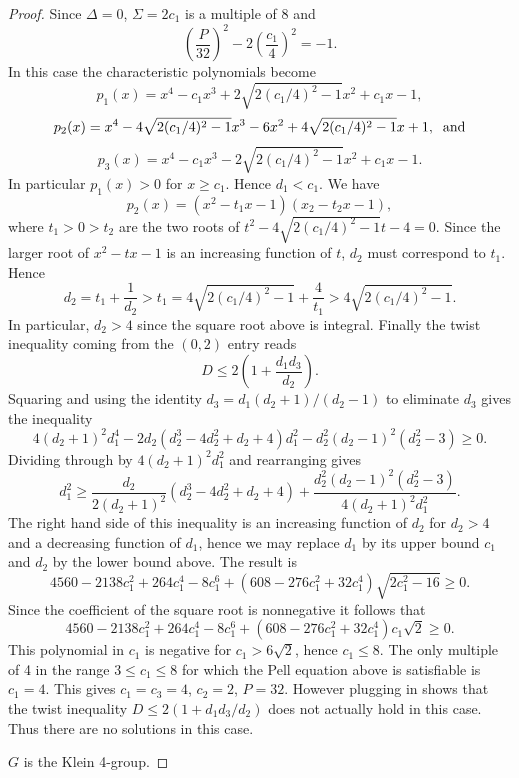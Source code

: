 \documentclass[12pt,psamsfonts]{amsart}
\numberwithin{equation}{section}
\theoremstyle{definition}
\begin{document}
\begin{proof}
Since $\Delta=0$, $\Sigma=2c_1$ is a multiple of 8 and
$$\left(\frac{P}{32}\right)^2-2\left(\frac{c_1}{4}\right)^2 = -1.$$
In this case the characteristic polynomials become
$$p_1(x)=x^4 - c_1 x^3 + 2 {\sqrt {2(c_1/4)^2-1}} x^2 + c_1 x -1,$$
$$p_2(x)=x^4 - 4 {\sqrt {2(c_1/4)^2-1}} x^3 -6 x^2 +4 {\sqrt {2(c_1/4)^2-1}} x
+ 1,\;\; {\rm and}$$
$$p_3(x)=x^4 - c_1 x^3 - 2 {\sqrt {2(c_1/4)^2-1}} x^2 + c_1 x -1.$$
In particular $p_1(x)>0$ for $x\ge c_1$. Hence $d_1<c_1$.
We have
$$p_2(x) = (x^2 - t_1 x -1)(x_2 - t_2 x - 1),$$
where $t_1>0>t_2$ are the two roots of $t^2 - 4 {\sqrt
{2(c_1/4)^2-1}} t - 4 =0$. Since the larger root of $x^2-tx-1$ is
an increasing function of $t$, $d_2$ must correspond to $t_1$.
Hence
$$d_2 = t_1 + \frac{1}{d_2} > t_1 = 4 {\sqrt {2(c_1/4)^2-1}} + \frac{4}{t_1}
> 4 {\sqrt {2(c_1/4)^2-1}}.$$
In particular, $d_2>4$ since the square root above is integral.
Finally the twist inequality coming from the $(0,2)$ entry reads
$$D\le 2 \left( 1+ \frac{d_1d_3}{d_2}\right).$$
Squaring and using the identity $d_3=d_1 (d_2+1)/(d_2-1)$ to
eliminate $d_3$ gives the inequality
$$4(d_2+1)^2 d_1^4 -2 d_2 (d_2^3-4d_2^2 + d_2 + 4) d_1^2
- d_2^2 (d_2-1)^2 (d_2^2-3)\ge 0.$$ Dividing through by
$4(d_2+1)^2 d_1^2$ and rearranging gives
$$d_1^2 \ge \frac{d_2}{2(d_2+1)^2}(d_2^3-4d_2^2 + d_2 + 4) +
\frac{d_2^2(d_2-1)^2(d_2^2-3)}{4(d_2+1)^2d_1^2}.$$ The right hand
side of this inequality is an increasing function of $d_2$ for
$d_2>4$ and a decreasing function of $d_1$, hence we may replace
$d_1$ by its upper bound $c_1$ and $d_2$ by the lower bound above.
The result is
$$4560 - 2138 c_1^2 + 264 c_1^4 - 8 c_1^6 +
(608 - 276 c_1^2 + 32 c_1^4) {\sqrt {2 c_1^2-16}}\ge 0.$$ Since
the coefficient of the square root is nonnegative it follows that
$$4560 - 2138 c_1^2 + 264 c_1^4 - 8 c_1^6 +
(608 - 276 c_1^2 + 32 c_1^4) c_1 {\sqrt {2}}\ge 0.$$ This
polynomial in $c_1$ is negative for $c_1>6 {\sqrt 2}$, hence
$c_1\le 8$. The only multiple of 4 in the range $3\le c_1\le 8$
for which the Pell equation above is satisfiable is $c_1=4$. This
gives $c_1=c_3=4$, $c_2=2$, $P=32$. However plugging in shows that
the twist inequality $D\le 2(1+ d_1 d_3/d_2)$ does not actually
hold in this case. Thus there are no solutions in this case.

\vspace{.5cm}

 $G$ is the Klein 4-group.

\vspace{.5cm}


\end{proof}
\end{document}
